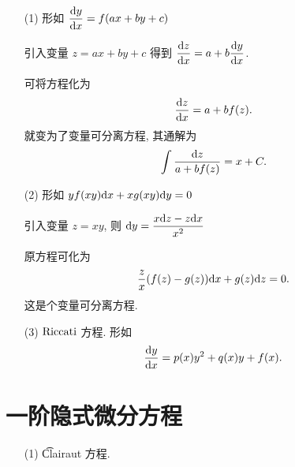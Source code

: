\begin{itemize}[leftmargin=1.5cm]
	\item[(1)] 形如 $\dfrac{\text {d} y}{\text {d} x}=f(ax+by+c)$
	
	引入变量 $z=ax+by+c$ 得到 $\dfrac{\text {d} z}{\text {d} x}=a+b\dfrac{\text {d} y}{\text {d} x}$.
	
	可将方程化为 $$\frac{\text {d} z}{\text {d} x}=a+bf(z).$$
	就变为了变量可分离方程, 其通解为 $$\int\frac{\text {d} z}{a+bf(z)}=x+C.$$
	
	\item[(2)] 形如 $yf(xy)\text {d} x+xg(xy)\text {d} y=0$
	
	引入变量 $z=xy$, 则 $\text {d} y=\dfrac{x\text {d} z-z\text {d} x}{x^2}$
	
	原方程可化为 $$\frac z x (f(z)-g(z))\text {d} x+g(z)\text {d} z=0.$$ 这是个变量可分离方程.
	
	\item[(3)]\label{Riccati} $\text {Riccati}$ 方程. 形如 $$\frac{\text {d} y}{\text {d} x}=p(x)y^2+q(x)y+f(x).$$
\end{itemize}

\section{一阶隐式微分方程}

\begin{itemize}[leftmargin=1.5cm]
	\item[(1)]\t{Clairaut} 方程.
\end{itemize}